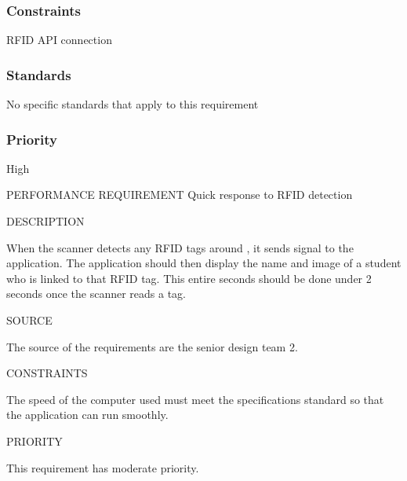 \subsubsection{Constraints}
RFID API connection
\subsubsection{Standards}
No specific standards that apply to this requirement
\subsubsection{Priority}
High

PERFORMANCE REQUIREMENT
Quick response to RFID detection

DESCRIPTION

When the scanner detects any RFID tags around , it sends signal to the application. The application should then display the name and image of a student who is linked to that RFID tag. This entire seconds should be done under 2 seconds once the scanner reads a tag.

SOURCE


The source of the requirements are the senior design team 2.

CONSTRAINTS

The speed of the computer used must meet the specifications standard so that the application can run smoothly.

PRIORITY

This requirement has moderate priority.